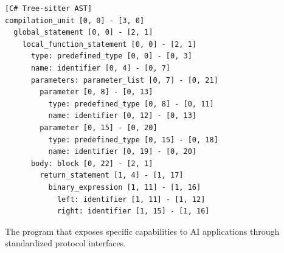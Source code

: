 \begin{description}[style=multiline, leftmargin=3cm, font=\normalfont, itemsep=1em]
{\footnotesize
\begin{verbatim}
[C# Tree-sitter AST]
compilation_unit [0, 0] - [3, 0]
  global_statement [0, 0] - [2, 1]
    local_function_statement [0, 0] - [2, 1]
      type: predefined_type [0, 0] - [0, 3]
      name: identifier [0, 4] - [0, 7]
      parameters: parameter_list [0, 7] - [0, 21]
        parameter [0, 8] - [0, 13]
          type: predefined_type [0, 8] - [0, 11]
          name: identifier [0, 12] - [0, 13]
        parameter [0, 15] - [0, 20]
          type: predefined_type [0, 15] - [0, 18]
          name: identifier [0, 19] - [0, 20]
      body: block [0, 22] - [2, 1]
        return_statement [1, 4] - [1, 17]
          binary_expression [1, 11] - [1, 16]
            left: identifier [1, 11] - [1, 12]
            right: identifier [1, 15] - [1, 16]
\end{verbatim}
}

    \item[\textbf{MCP Server}] The program that exposes specific capabilities to AI applications through standardized protocol interfaces.
\end{description}
